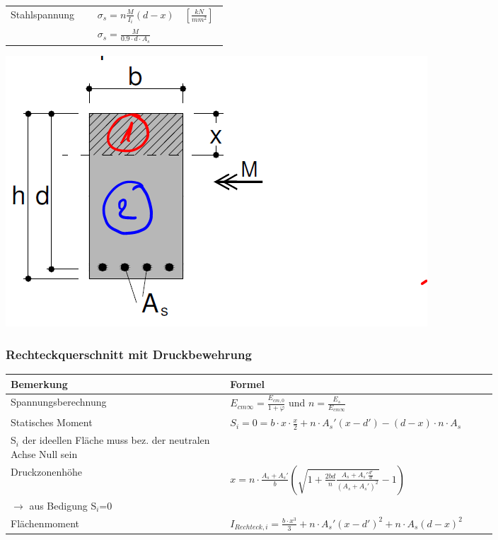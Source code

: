 \begin{landscape}
\begin{multicols}{3}
\begin{tabular}{p{0.4\linewidth}|p{0.4\linewidth}|l}
		Stahlspannung			& $ \sigma_s = n \frac{M}{I_i} (d - x) $	& $ \left[ \frac{kN}{mm^2}\right] $ \\
		& $ \sigma_s = \frac{M}{0.9 \cdot d \cdot A_s} $	& \\
		
	\end{tabular}

	\includegraphics[width=0.6\linewidth]{images/Risse2QSRechtecko.PNG}




	
	\subsubsection{Rechteckquerschnitt mit Druckbewehrung}
	
	
	\begin{tabular}{p{0.4\linewidth}|p{0.4\linewidth}}
		
		Bemerkung		& Formel	 \\ \hline
		
		
		\hspace*{0pt} Spannungsberechnung	& $ E_{cm\infty} = \frac{E_{cm,0}}{1 + \varphi} $ und $ n = \frac{E_s}{E_{cm\infty}} $  \\
		
		Statisches Moment	& $ S_i = 0 = b \cdot x \cdot \frac{x}{2} + n \cdot A_s' (x - d') - (d - x) \cdot n \cdot A_s $  \\
		S$_i$ der ideellen Fläche muss bez. der neutralen Achse Null sein &	 \\
		
		Druckzonenhöhe		& $ x = n \cdot \frac{A_s + A_s'}{b} \left( \sqrt{1 + \frac{2 b d}{n} \frac{A_s + A_s' \frac{d'}{d}}{(A_s + A_s')^2} } - 1 \right) $   \\
		$ \rightarrow $ aus Bedigung S$_i$=0 &  \\
		
		Flächenmoment		& $ I_{Rechteck,i} = \frac{b \cdot x^3}{3} + n \cdot A_s' (x - d')^2 + n \cdot A_s (d - x)^2 $	  \\
		

\end{tabular}
\end{multicols}
\end{landscape}
